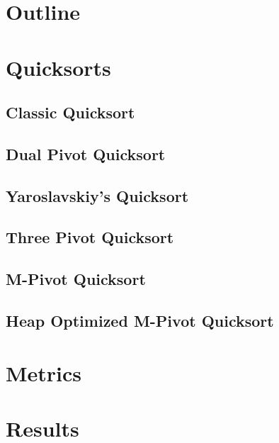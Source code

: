 
\begin{frame}
	\titlepage
\end{frame}


\section*{Outline}
\begin{frame}
	\tableofcontents
\end{frame}

\section{Quicksorts}
\subsection{Classic Quicksort}
\subsection{Dual Pivot Quicksort}
\subsection{Yaroslavskiy's Quicksort}
\subsection{Three Pivot Quicksort}
\subsection{M-Pivot Quicksort}
\subsection{Heap Optimized M-Pivot Quicksort}

\section{Metrics}

\section{Results}
